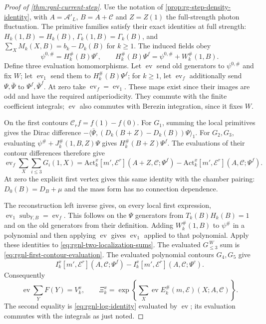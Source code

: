 \begin{proof}[Proof of \cref{thm:rgnl-current-step}]
Use the notation of \cref{prop:rg-step-density-identity},
with $A=\mathscr A'_L$, $B=A+\mathscr C$ and
$Z=Z(1)$ the full-strength photon fluctuation.
The primitive families satisfy their exact identities
at full strength:
$H_k(1,B)=H_k(B)$, $\Gamma_k(1,B)=\Gamma_k(B)$, and
$\sum_XM_k(X,B)=b_k-D_k(B)$ for $k\ge1$.
The induced fields obey
\[
 \psi^{0,\#}=H_k^\#(B)\Psi^c,\qquad
 H_k^\#(B)\Psi^f=\psi^{0,\#}+W_k^\#(1,B).
\]
Define three evaluation homomorphisms. Let $\operatorname{ev}$
send old generators to $\psi^{0,\#}$ and fix $W$;
let $\operatorname{ev}_1$ send them to $H_k^\#(B)\Psi^f$;
for $k\ge1$, let $\operatorname{ev}_f$ additionally send
$\Psi,\bar\Psi$ to $\Psi^f,\bar\Psi^f$.
At zero take $\operatorname{ev}_f=\operatorname{ev}_1$.
These maps exist since their images are odd and have
the required antiperiodicity. They commute with the
finite coefficient integrals; $\operatorname{ev}$ also
commutes with Berezin integration, since it fixes $W$.

On the first contours $\mathcal C_rf=f(1)-f(0)$.
For $G_1$, summing the local primitives gives the
Dirac difference
$-\langle\bar\Psi,(D_k(B+Z)-D_k(B))\Psi\rangle_1$.
For $G_2,G_3$, evaluating
$\psi^\#+J_k^\#(1,B,Z)\Psi$ gives
$H_k^\#(B+Z)\Psi^f$.
The evaluations of their contour differences therefore give
\begin{equation}\label{eq:rgnl-first-contour-evaluation}
 \operatorname{ev}_f\sum_X\sum_{i\le3}G_i(1,X)
  =\mathrm{Act}_k^x[m',\mathscr E^r](A+Z,\mathscr C;\Psi^f)
       -\mathrm{Act}_k^x[m',\mathscr E^r](A,\mathscr C;\Psi^f).
\end{equation}
At zero the explicit first vertex gives this same
identity with the chamber pairing: $D_0(B)=D_B+\mu$
and the mass form has no connection dependence.

The reconstruction left inverse gives, on every local
first expression,
$\operatorname{ev}_1\operatorname{sub}_{Y,B}
=\operatorname{ev}_f$.
This follows on the $\Psi$ generators from $T_k(B)H_k(B)=1$
and on the old generators from their definition.
Adding $W_k^\#(1,B)$ to $\psi^\#$ in a polynomial and then
applying $\operatorname{ev}$ gives
$\operatorname{ev}_1$ applied to that polynomial.
Apply these identities to
\eqref{eq:rgnl-two-localization-sums}.
The evaluated $G_{\le3}^{\,W}$ sum is
\eqref{eq:rgnl-first-contour-evaluation}.
The evaluated polynomial contours $G_4,G_5$ give
\[
 I_k^x[m',\mathscr E^r](A,\mathscr C;\Psi^f)
                      -I_k^x[m',\mathscr E^r](A,\mathscr C;\Psi^c).
\]
Consequently
\[
 \operatorname{ev}\sum_YF(Y)=V_k^x,\qquad
 \Xi_k^x
     =\exp\left\{\sum_X
                  \operatorname{ev}E_k^\#(m,\mathscr E)(X;A,\mathscr C)\right\}.
\]
The second equality is
\eqref{eq:rgnl-log-identity} evaluated by
$\operatorname{ev}$; its evaluation commutes with the
integrals as just noted.


\end{proof}
